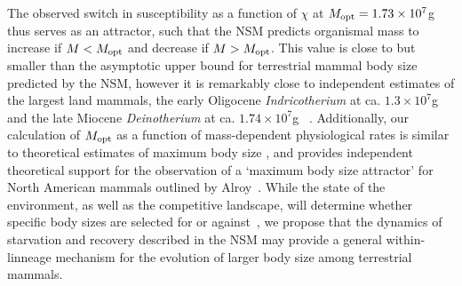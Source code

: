 \documentclass{pnastwo}
\begin{document}
\begin{article}
The observed switch in susceptibility as a function of $\chi$ at $M_{\rm opt}= 1.73\times10^7$g thus serves as an attractor, such that the NSM predicts organismal mass to increase if $M<M_{\rm opt}$ and decrease if $M>M_{\rm opt}$.
This value is close to but smaller than the asymptotic upper bound for terrestrial mammal body size predicted by the NSM, however it is remarkably close to independent estimates of the largest land mammals, the early Oligocene \emph{Indricotherium} at ca. $1.3\times10^7$g and the late Miocene \emph{Deinotherium} at ca. $1.74\times10^7$g ~\cite{Smith:2010p3442}.
Additionally, our calculation of $M_{\rm opt}$ as a function of mass-dependent physiological rates is similar to theoretical estimates of maximum body size \cite{Clauset:2009fh}, and provides independent theoretical support for the observation of a `maximum body size attractor' for North American mammals outlined by Alroy~\cite{Alroy:1998p1594}.
While the state of the environment, as well as the competitive landscape, will determine whether specific body sizes are selected for or against~\cite{Saarinen:2014br}, we propose that the dynamics of starvation and recovery described in the NSM may provide a general within-linneage mechanism for the evolution of larger body size among terrestrial mammals.






\end{article}
\end{document}
